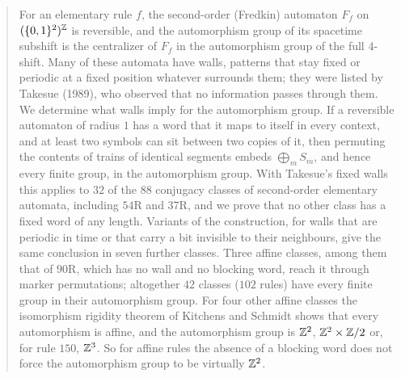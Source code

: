 \begin{abstract}
For an elementary rule $f$, the second-order (Fredkin) automaton $F_f$ on $(\{0,1\}^2)^{\Z}$ is reversible, and the automorphism group of its spacetime subshift is the centralizer of $F_f$ in the automorphism group of the full $4$-shift. Many of these automata have walls, patterns that stay fixed or periodic at a fixed position whatever surrounds them; they were listed by Takesue (1989), who observed that no information passes through them. We determine what walls imply for the automorphism group. If a reversible automaton of radius $1$ has a word that it maps to itself in every context, and at least two symbols can sit between two copies of it, then permuting the contents of trains of identical segments embeds $\bigoplus_mS_m$, and hence every finite group, in the automorphism group. With Takesue's fixed walls this applies to $32$ of the $88$ conjugacy classes of second-order elementary automata, including $54$R and $37$R, and we prove that no other class has a fixed word of any length. Variants of the construction, for walls that are periodic in time or that carry a bit invisible to their neighbours, give the same conclusion in seven further classes. Three affine classes, among them that of $90$R, which has no wall and no blocking word, reach it through marker permutations; altogether $42$ classes ($102$ rules) have every finite group in their automorphism group. For four other affine classes the isomorphism rigidity theorem of Kitchens and Schmidt shows that every automorphism is affine, and the automorphism group is $\Z^2$, $\Z^2\times\Z/2$ or, for rule $150$, $\Z^3$. So for affine rules the absence of a blocking word does not force the automorphism group to be virtually $\Z^2$.
\end{abstract}
